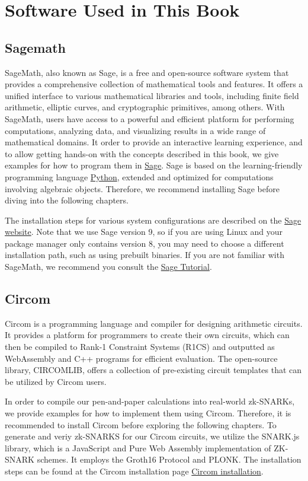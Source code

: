 \chapter{Software Used in This Book}

\section{Sagemath}
\label{sagemath_setup}
SageMath, also known as Sage, is a free and open-source software system that provides a comprehensive collection of mathematical tools and features. It offers a unified interface to various mathematical libraries and tools, including finite field arithmetic, elliptic curves, and cryptographic primitives, among others. With SageMath, users have access to a powerful and efficient platform for performing computations, analyzing data, and visualizing results in a wide range of mathematical domains. It order to provide an interactive learning experience, and to allow getting hands-on with the concepts described in this book, we give examples for how to program them in \href{https://www.sagemath.org/}{Sage}. Sage is based on the learning-friendly programming language \href{https://www.python.org/}{Python},  extended and optimized for computations involving algebraic objects. Therefore, we recommend installing Sage before diving into the following chapters.

The installation steps for various system configurations are described on the \href{https://doc.sagemath.org/html/en/installation/index.html}{Sage website}. Note that we use Sage version 9, so if you are using Linux and your package manager only contains version 8, you may need to choose a different installation path, such as using prebuilt binaries. If you are not familiar with SageMath, we recommend you consult the \href{https://doc.sagemath.org/html/en/tutorial/index.html}{Sage Tutorial}.

\section{Circom}
\label{circom_setup}
Circom is a programming language and compiler for designing arithmetic circuits. It provides a platform for programmers to create their own circuits, which can then be compiled to Rank-1 Constraint Systems (R1CS) and outputted as WebAssembly and C++ programs for efficient evaluation. The open-source library, CIRCOMLIB, offers a collection of pre-existing circuit templates that can be utilized by Circom users.

In order to compile our pen-and-paper calculations into real-world zk-SNARKs, we provide examples for how to implement them using Circom. Therefore, it is recommended to install Circom before exploring the following chapters. To generate and veriy zk-SNARKS for our Circom circuits, we utilize the SNARK.js library, which is a JavaScript and Pure Web Assembly implementation of ZK-SNARK schemes. It employs the Groth16 Protocol and PLONK. The installation steps can be found at the Circom installation page \href{https://docs.circom.io/getting-started/installation/#installing-circom}{Circom installation}.

